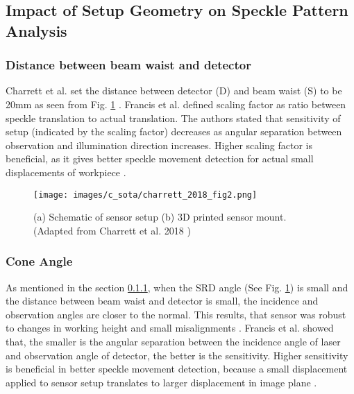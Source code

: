 \subsection{Impact of Setup Geometry on Speckle Pattern Analysis}

    \subsubsection{Distance between beam waist and detector}\label{Subsubsection:Distance_Beam_Waist_Detector}
    Charrett et al. set the distance between detector (D) and beam waist (S) to be 20mm as seen from Fig. \ref{fig:charrett_2018_fig2} \cite{charrett_2018}. Francis et al. \cite{francis_autonomous} defined scaling factor as ratio between speckle translation to actual translation. The authors stated that sensitivity of setup (indicated by the scaling factor) decreases as angular separation between observation and illumination direction increases. Higher scaling factor is beneficial, as it gives better speckle movement detection for actual small displacements of workpiece \cite{francis_autonomous}.

    \begin{figure}[h]
        \centering
        \texttt{[image: images/c\_sota/charrett\_2018\_fig2.png]}
        \caption{(a) Schematic of sensor setup (b) 3D printed sensor mount. (Adapted from Charrett et al. 2018 \cite{charrett_2018})}
        \label{fig:charrett_2018_fig2}
    \end{figure}


    \subsubsection{Cone Angle}
    As mentioned in the section \ref{Subsubsection:Distance_Beam_Waist_Detector}, when the SRD angle (See Fig. \ref{fig:charrett_2018_fig2}) is small and the distance between beam waist and detector is small, the incidence and observation angles are closer to the normal. This results, that sensor was robust to changes in working height and small misalignments \cite{charrett_2018}. Francis et al. showed that, the smaller is the angular separation between the incidence angle of laser and observation angle of detector, the better is the sensitivity. Higher sensitivity is beneficial in better speckle movement detection, because a small displacement applied to sensor setup translates to larger displacement in image plane \cite{francis_autonomous}.
    
